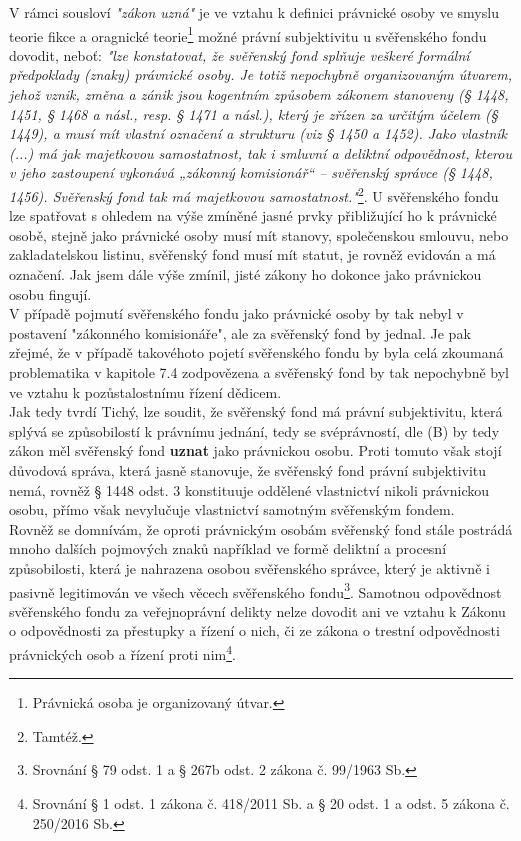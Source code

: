 \documentclass{article}
\begin{document}
V rámci sousloví \textit{"zákon uzná"} je ve vztahu k definici právnické osoby ve smyslu teorie fikce a oragnické teorie\footnote{Právnická osoba je organizovaný útvar.} možné právní subjektivitu u svěřenského fondu dovodit, neboť: \textit{"lze konstatovat, že svěřenský fond splňuje veškeré formální předpoklady (znaky) právnické osoby. Je totiž nepochybně organizovaným útvarem, jehož vznik, změna a zánik jsou kogentním způsobem zákonem stanoveny (§ 1448, 1451, § 1468 a násl., resp. § 1471 a násl.), který je zřízen za určitým účelem (§ 1449), a musí mít vlastní označení a strukturu (viz § 1450 a 1452). Jako vlastník (...) má jak majetkovou samostatnost, tak i smluvní a deliktní odpovědnost, kterou v jeho zastoupení vykonává „zákonný komisionář“ – svěřenský správce (§ 1448, 1456). Svěřenský fond tak má majetkovou samostatnost."}\footnote{Tamtéž.}. U svěřenského fondu lze spatřovat s ohledem na výše zmíněné jasné prvky přibližující ho k právnické osobě, stejně jako právnické osoby musí mít stanovy, společenskou smlouvu, nebo zakladatelskou listinu, svěřenský fond musí mít statut, je rovněž evidován a má označení. Jak jsem dále výše zmínil, jisté zákony ho dokonce jako právnickou osobu fingují.\\

V případě pojmutí svěřenského fondu jako právnické osoby by tak nebyl v postavení "zákonného komisionáře", ale za svěřenský fond by jednal. Je pak zřejmé, že v případě takovéhoto pojetí svěřenského fondu by byla celá zkoumaná problematika v kapitole 7.4 zodpovězena a svěřenský fond by tak nepochybně byl ve vztahu k pozůstalostnímu řízení dědicem.\\

Jak tedy tvrdí Tichý, lze soudit, že svěřenský fond má právní subjektivitu, která splývá se způsobilostí k právnímu jednání, tedy se svéprávností, dle (B) by tedy zákon měl svěřenský fond \textbf{uznat} jako právnickou osobu. Proti tomuto však stojí důvodová správa, která jasně stanovuje, že svěřenský fond právní subjektivitu nemá, rovněž § 1448 odst. 3 konstituuje oddělené vlastnictví nikoli právnickou osobu, přímo však nevylučuje vlastnictví samotným svěřenským fondem.\\

Rovněž se domnívám, že oproti právnickým osobám svěřenský fond stále postrádá mnoho dalších pojmových znaků například ve formě deliktní a procesní způsobilosti, která je nahrazena osobou svěřenského správce, který je aktivně i pasivně legitimován ve všech věcech svěřenského fondu\footnote{Srovnání § 79 odst. 1 a § 267b odst. 2 zákona č. 99/1963 Sb.}. Samotnou odpovědnost svěřenského fondu za veřejnoprávní delikty nelze dovodit ani ve vztahu k Zákonu o odpovědnosti za přestupky a řízení o nich, či ze zákona o trestní odpovědnosti právnických osob a řízení proti nim\footnote{Srovnání § 1 odst. 1 zákona č. 418/2011 Sb. a § 20 odst. 1 a odst. 5 zákona č. 250/2016 Sb.}.
\end{document}
